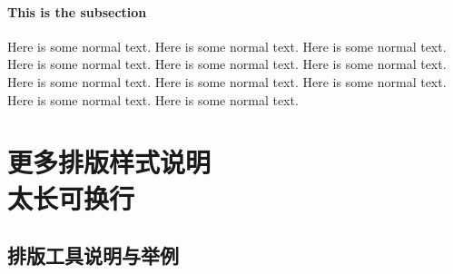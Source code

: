 \documentclass{WileySev}
\begin{document}
\subsection{This is the subsection}
Here is some normal text.
Here is some normal text.
Here is some normal text.
Here is some normal text.
Here is some normal text.
Here is some normal text.
Here is some normal text.
Here is some normal text.
Here is some normal text.
Here is some normal text.
Here is some normal text.






\part[更多排版样式说明]
{更多排版样式说明\\ 太长可换行}

\chapter[排版工具说明与举例]
{排版工具说明与举例}
\end{document}
